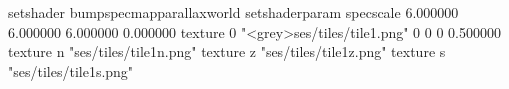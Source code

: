 setshader bumpspecmapparallaxworld
setshaderparam specscale 6.000000 6.000000 6.000000 0.000000
texture 0 "<grey>ses/tiles/tile1.png" 0 0 0 0.500000
texture n "ses/tiles/tile1n.png"
texture z "ses/tiles/tile1z.png"
texture s "ses/tiles/tile1s.png"

